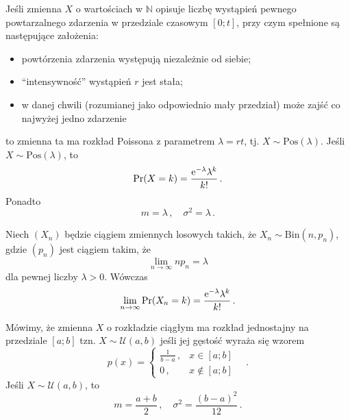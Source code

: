 \documentclass{myclass}
\numberwithin{equation}{subsection}
\begin{document}
\begin{definition}
Jeśli zmienna \(X\) o wartościach w \(\mathbb{N}\) opisuje liczbę wystąpień pewnego powtarzalnego
zdarzenia w przedziale czasowym \([0;t]\), przy czym spełnione są następujące założenia:
\begin{itemize}

    \item powtórzenia zdarzenia występują niezależnie od siebie;
    
    \item \enquote{intensywność} wystąpień \(r\) jest stała;

    \item w danej chwili (rozumianej jako odpowiednio mały przedział) może zajść co najwyżej jedno
    zdarzenie

\end{itemize}

to zmienna ta ma rozkład Poissona z parametrem \(\lambda = rt\), tj. \(X \sim
\mathrm{Pos}(\lambda)\). Jeśli \(X \sim \mathrm{Pos}(\lambda)\), to
\begin{equation*}
    \Pr(X = k) = \frac{\mathrm{e}^{-\lambda} \lambda^k}{k!}\,.
\end{equation*}
Ponadto
\begin{equation*}
    m = \lambda\,,\quad \sigma^2 = \lambda\,.
\end{equation*}
\end{definition}

\begin{theorem}[Poissona]
Niech \((X_n)\) będzie ciągiem zmiennych losowych takich, że \(X_n \sim \mathrm{Bin}(n, p_n)\),
gdzie \((p_n)\) jest ciągiem takim, że
\begin{equation*}
    \lim_{n \to \infty} n p_n = \lambda
\end{equation*}
dla pewnej liczby \(\lambda > 0\). Wówczas
\begin{equation*}
    \lim_{n \to \infty} \Pr(X_n = k) = \frac{\mathrm{e}^{-\lambda} \lambda^k}{k!}\,.
\end{equation*}
\end{theorem}

\begin{definition}
Mówimy, że zmienna \(X\) o rozkładzie ciągłym ma rozkład jednostajny na przedziale \([a;b]\) tzn.
\(X \sim \mathcal{U}(a,b)\) jeśli jej gęstość wyraża się wzorem
\begin{equation*}
    p(x) = \begin{cases}
        \frac{1}{b - a}\,, &x\in[a;b]\\
        0\,,&x\notin[a;b]
    \end{cases}\quad.
\end{equation*}
Jeśli \(X \sim \mathcal{U}(a,b)\), to
\begin{equation*}
    m = \frac{a+b}{2}\,,\quad \sigma^2 = \frac{(b-a)^2}{12}\,.
\end{equation*}
\end{definition}
\end{document}
